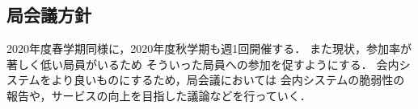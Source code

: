 \subsection*{局会議方針}

2020年度春学期同様に，2020年度秋学期も週1回開催する．
また現状，参加率が著しく低い局員がいるため
そういった局員への参加を促すようにする．
会内システムをより良いものにするため，局会議においては
会内システムの脆弱性の報告や，サービスの向上を目指した議論などを行っていく．
